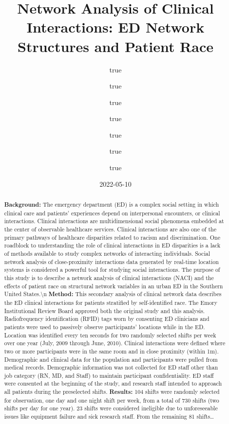 \documentclass[
]{article}
\title{Network Analysis of Clinical Interactions: ED Network Structures
and Patient Race}
\author{true \and true \and true \and true \and true \and true \and true}
\date{2022-05-10}
\begin{document}
\maketitle
\begin{abstract}
\textbf{Background:} The emergency department (ED) is a complex social
setting in which clinical care and patients' experiences depend on
interpersonal encounters, or clinical interactions. Clinical
interactions are multidimensional social phenomena embedded at the
center of observable healthcare services. Clinical interactions are also
one of the primary pathways of healthcare disparities related to racism
and discrimination. One roadblock to understanding the role of clinical
interactions in ED disparities is a lack of methods available to study
complex networks of interacting individuals. Social network analysis of
close-proximity interactions data generated by real-time location
systems is considered a powerful tool for studying social interactions.
The purpose of this study is to describe a network analysis of clinical
interactions (NACI) and the effects of patient race on structural
network variables in an urban ED in the Southern United
States.\textbackslash n \textbf{Method:} This secondary analysis of
clinical network data describes the ED clinical interactions for
patients stratified by self-identified race. The Emory Institutional
Review Board approved both the original study and this analysis.
Radiofrequency identification (RFID) tags worn by consenting ED
clinicians and patients were used to passively observe participants'
locations while in the ED. Location was identified every ten seconds for
two randomly selected shifts per week over one year (July, 2009 through
June, 2010). Clinical interactions were defined where two or more
participants were in the same room and in close proximity (within 1m).
Demographic and clinical data for the population and participants were
pulled from medical records. Demographic information was not collected
for ED staff other than job category (RN, MD, and Staff) to maintain
participant confidentiality. ED staff were consented at the beginning of
the study, and research staff intended to approach all patients during
the preselected shifts. \textbf{Results:} 104 shifts were randomly
selected for observation, one day and one night shift per week, from a
total of 730 shifts (two shifts per day for one year). 23 shifts were
considered ineligible due to unforeseeable issues like equipment failure
and sick research staff. From the remaining 81 shifts\ldots{}
\end{abstract}
\end{document}
